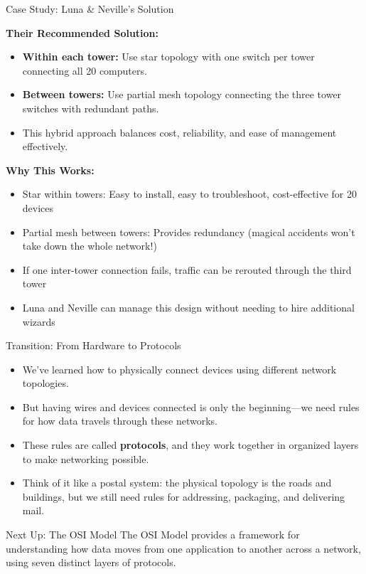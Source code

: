 \documentclass[aspectratio=169]{beamer}
\begin{document}
\begin{frame}{Case Study: Luna \& Neville's Solution}

\textbf{Their Recommended Solution:}
\begin{itemize}
    \item \textbf{Within each tower:} Use star topology with one switch per tower connecting all 20 computers.
    \item \textbf{Between towers:} Use partial mesh topology connecting the three tower switches with redundant paths.
    \item This hybrid approach balances cost, reliability, and ease of management effectively.
\end{itemize}

\vspace{0.2cm}

\textbf{Why This Works:}
\begin{itemize}
    \item Star within towers: Easy to install, easy to troubleshoot, cost-effective for 20 devices
    \item Partial mesh between towers: Provides redundancy (magical accidents won't take down the whole network!)
    \item If one inter-tower connection fails, traffic can be rerouted through the third tower
    \item Luna and Neville can manage this design without needing to hire additional wizards
\end{itemize}

\end{frame}

\begin{frame}{Transition: From Hardware to Protocols}

\begin{itemize}
    \item We've learned how to physically connect devices using different network topologies.
    \item But having wires and devices connected is only the beginning—we need rules for how data travels through these networks.
    \item These rules are called \textbf{protocols}, and they work together in organized layers to make networking possible.
    \item Think of it like a postal system: the physical topology is the roads and buildings, but we still need rules for addressing, packaging, and delivering mail.
\end{itemize}

\vspace{0.3cm}

\begin{alertblock}{Next Up: The OSI Model}
The OSI Model provides a framework for understanding how data moves from one application to another across a network, using seven distinct layers of protocols.
\end{alertblock}

\end{frame}
\end{document}
